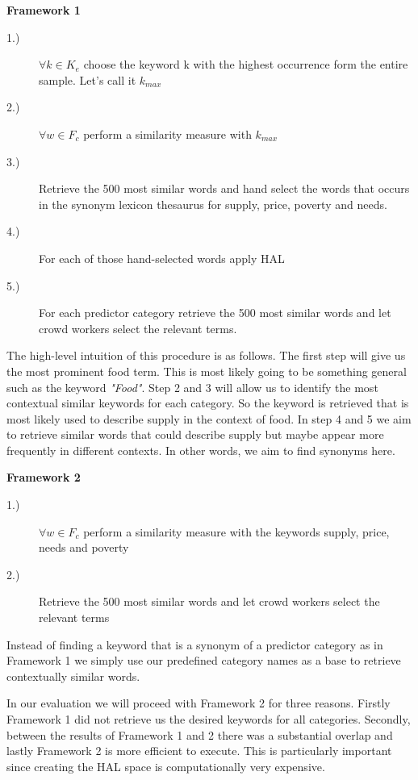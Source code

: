 \textbf{Framework 1}

\begin{description}
  \item[1.)] $\forall k \in K_e$ choose the keyword k with the highest occurrence form the entire sample. Let's call it $k_{max}$  
  \item[2.)] $\forall w \in F_c $ perform a similarity measure with $k_{max}$
  \item[3.)] Retrieve the 500 most similar words and hand select the words that occurs in the synonym lexicon thesaurus for supply, price, poverty and needs. 
    \item[4.)] For each of those hand-selected words  apply HAL 
  \item[5.)] For each predictor category retrieve the 500 most similar words and let crowd workers select the relevant terms. 
    \end{description}

The high-level intuition of this procedure is as follows. The first step will give us the most prominent food term. This is most likely going to be something general such as the keyword \emph{"Food"}. Step 2 and 3 will allow us to identify the most contextual similar keywords for each category. So the keyword is retrieved that is most likely used to describe supply in the context of food. In step 4 and 5 we aim to retrieve similar words that could describe supply but maybe appear more frequently in different contexts. In other words, we aim to find synonyms here.   


\textbf{Framework 2}


\begin{description}
   \item[1.)] $\forall w \in F_c $ perform a similarity measure with the keywords supply, price, needs and poverty
  \item[2.)]  Retrieve the 500 most similar words and let crowd workers select the relevant terms  
  \end{description}

Instead of finding a keyword that is a synonym of a predictor category as in Framework 1 we simply use our predefined category names as a base to retrieve contextually similar words. 

In our evaluation we will proceed with Framework 2 for three reasons. Firstly Framework 1 did not retrieve us the desired keywords for all categories. Secondly, between the results of Framework 1 and 2 there was a substantial overlap and lastly Framework 2 is more efficient to execute. This is particularly important since creating the HAL space is computationally very expensive. 
 

